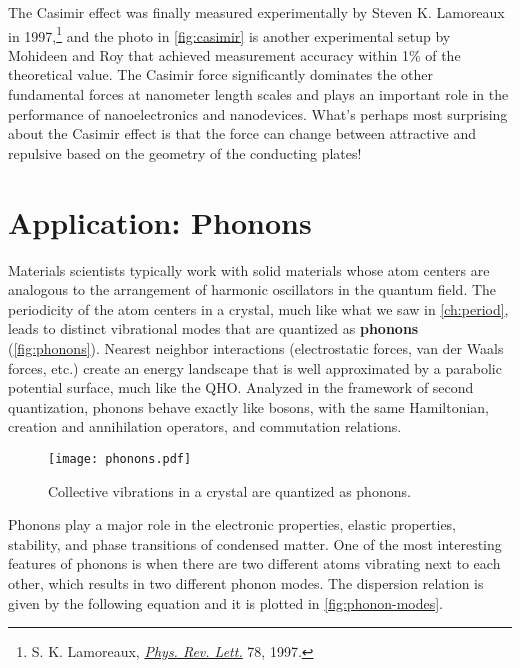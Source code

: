 The Casimir effect was finally measured experimentally by Steven K. Lamoreaux in 1997,\footnote{S. K. Lamoreaux, \href{https://journals.aps.org/prl/abstract/10.1103/PhysRevLett.78.5}{\emph{Phys. Rev. Lett.}} 78, 1997.} and the photo in \autoref{fig:casimir} is another experimental setup by Mohideen and Roy that achieved measurement accuracy within 1\% of the theoretical value. 
The Casimir force significantly dominates the other fundamental forces at nanometer length scales and plays an important role in the performance of nanoelectronics and nanodevices. 
What's perhaps most surprising about the Casimir effect is that the force can change between attractive and repulsive based on the geometry of the conducting plates! 


\section{Application: Phonons}

Materials scientists typically work with solid materials whose atom centers are analogous to the arrangement of harmonic oscillators in the quantum field. 
The periodicity of the atom centers in a crystal, much like what we saw in \autoref{ch:period}, leads to distinct vibrational modes that are quantized as \textbf{phonons} (\autoref{fig:phonons}). 
Nearest neighbor interactions (electrostatic forces, van der Waals forces, etc.) create an energy landscape that is well approximated by a parabolic potential surface, much like the QHO. 
Analyzed in the framework of second quantization, phonons behave exactly like bosons, with the same Hamiltonian, creation and annihilation operators, and commutation relations. 

\begin{figure}[!h]
	\centering
	\texttt{[image: phonons.pdf]}
	\caption{Collective vibrations in a crystal are quantized as phonons.}
	\label{fig:phonons}
\end{figure}

Phonons play a major role in the electronic properties, elastic properties, stability, and phase transitions of condensed matter. 
One of the most interesting features of phonons is when there are two different atoms vibrating next to each other, which results in two different phonon modes. 
The dispersion relation is given by the following equation and it is plotted in \autoref{fig:phonon-modes}.

